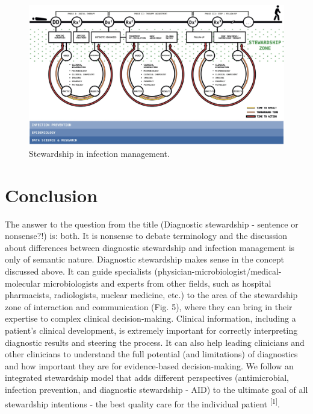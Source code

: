 \documentclass[
]{book}
\begin{document}
\begin{figure}

{\centering \includegraphics[width=1\linewidth]{images/02-05} 

}

\caption{Stewardship in infection management.}\label{fig:fig2-5}
\end{figure}

\hypertarget{conclusion}{%
\section{Conclusion}\label{conclusion}}

The answer to the question from the title (Diagnostic stewardship - sentence or nonsense?!) is: both. It is nonsense to debate terminology and the discussion about differences between diagnostic stewardship and infection management is only of semantic nature. Diagnostic stewardship makes sense in the concept discussed above. It can guide specialists (physician-microbiologist/medical-molecular microbiologists and experts from other fields, such as hospital pharmacists, radiologists, nuclear medicine, etc.) to the area of the stewardship zone of interaction and communication (Fig. 5), where they can bring in their expertise to complex clinical decision-making. Clinical information, including a patient's clinical development, is extremely important for correctly interpreting diagnostic results and steering the process. It can also help leading clinicians and other clinicians to understand the full potential (and limitations) of diagnostics and how important they are for evidence-based decision-making. We follow an integrated stewardship model that adds different perspectives (antimicrobial, infection prevention, and diagnostic stewardship - AID) to the ultimate goal of all stewardship intentions - the best quality care for the individual patient \textsuperscript{{[}1{]}}.
\end{document}
